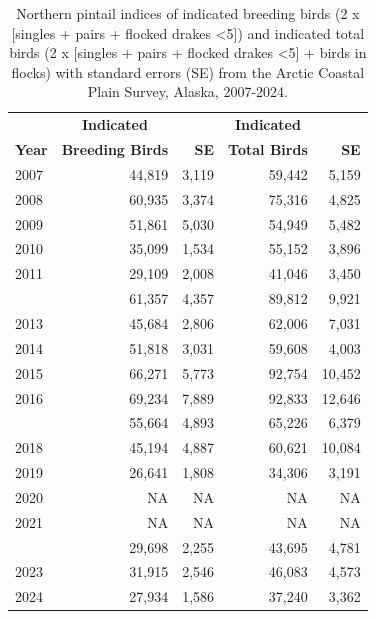 \documentclass[
]{article}
\begin{document}
\begin{longtable}[t]{lrrrr}

\caption{\label{tbl-NOPI}Northern pintail indices of indicated breeding
birds (2 x {[}singles + pairs + flocked drakes \textless5{]}) and
indicated total birds (2 x {[}singles + pairs + flocked drakes
\textless5{]} + birds in flocks) with standard errors (SE) from the
Arctic Coastal Plain Survey, Alaska, 2007-2024.}

\tabularnewline

\\
\toprule
\multicolumn{1}{c}{\textbf{ }} & \multicolumn{1}{c}{\textbf{Indicated}} & \multicolumn{1}{c}{\textbf{ }} & \multicolumn{1}{c}{\textbf{Indicated}} & \multicolumn{1}{c}{\textbf{ }} \\
\cmidrule(l{3pt}r{3pt}){2-2} \cmidrule(l{3pt}r{3pt}){4-4}
\textbf{Year} & \textbf{Breeding Birds} & \textbf{SE} & \textbf{Total Birds} & \textbf{SE}\\
\midrule
2007 & 44,819 & 3,119 & 59,442 & 5,159\\
2008 & 60,935 & 3,374 & 75,316 & 4,825\\
2009 & 51,861 & 5,030 & 54,949 & 5,482\\
2010 & 35,099 & 1,534 & 55,152 & 3,896\\
2011 & 29,109 & 2,008 & 41,046 & 3,450\\
\addlinespace
2012 & 61,357 & 4,357 & 89,812 & 9,921\\
2013 & 45,684 & 2,806 & 62,006 & 7,031\\
2014 & 51,818 & 3,031 & 59,608 & 4,003\\
2015 & 66,271 & 5,773 & 92,754 & 10,452\\
2016 & 69,234 & 7,889 & 92,833 & 12,646\\
\addlinespace
2017 & 55,664 & 4,893 & 65,226 & 6,379\\
2018 & 45,194 & 4,887 & 60,621 & 10,084\\
2019 & 26,641 & 1,808 & 34,306 & 3,191\\
2020 & NA & NA & NA & NA\\
2021 & NA & NA & NA & NA\\
\addlinespace
2022 & 29,698 & 2,255 & 43,695 & 4,781\\
2023 & 31,915 & 2,546 & 46,083 & 4,573\\
2024 & 27,934 & 1,586 & 37,240 & 3,362\\
\bottomrule

\end{longtable}
\end{document}
